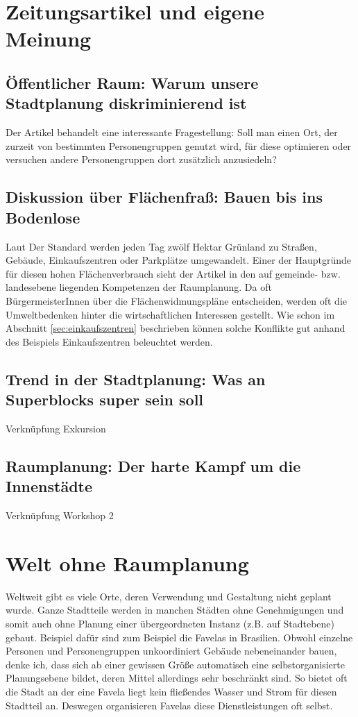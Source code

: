 \documentclass[]{article}
\begin{document}
\section{Zeitungsartikel und eigene Meinung}
\subsection{Öffentlicher Raum: Warum unsere Stadtplanung diskriminierend ist}
Der Artikel behandelt eine interessante Fragestellung: Soll man einen Ort, der zurzeit von bestimmten Personengruppen genutzt wird, für diese optimieren oder versuchen andere Personengruppen dort zusätzlich anzusiedeln?

\subsection{Diskussion über Flächenfraß: Bauen bis ins Bodenlose}
Laut Der Standard werden jeden Tag zwölf Hektar Grünland zu Straßen, Gebäude, Einkaufszentren oder Parkplätze umgewandelt. Einer der Hauptgründe für diesen hohen Flächenverbrauch sieht der Artikel in den auf gemeinde- bzw. landesebene liegenden Kompetenzen der Raumplanung. Da oft BürgermeisterInnen über die Flächenwidmungspläne entscheiden, werden oft die Umweltbedenken hinter die wirtschaftlichen Interessen gestellt. Wie schon im Abschnitt \ref{sec:einkaufszentren} beschrieben können solche Konflikte gut anhand des Beispiels Einkaufszentren beleuchtet werden.

\subsection{Trend in der Stadtplanung: Was an Superblocks super sein soll}
Verknüpfung Exkursion

\subsection{Raumplanung: Der harte Kampf um die Innenstädte}
Verknüpfung Workshop 2

\section{Welt ohne Raumplanung}
Weltweit gibt es viele Orte, deren Verwendung und Gestaltung nicht geplant wurde. Ganze Stadtteile werden in manchen Städten ohne Genehmigungen und somit auch ohne Planung einer übergeordneten Instanz (z.B. auf Stadtebene) gebaut. Beispiel dafür sind zum Beispiel die Favelas in Brasilien. Obwohl einzelne Personen und Personengruppen unkoordiniert Gebäude nebeneinander bauen, denke ich, dass sich ab einer gewissen Größe automatisch eine selbstorganisierte Planungsebene bildet, deren Mittel allerdings sehr beschränkt sind. So bietet oft die Stadt an der eine Favela liegt kein fließendes Wasser und Strom für diesen Stadtteil an. Deswegen organisieren Favelas diese Dienstleistungen oft selbst.
\end{document}
